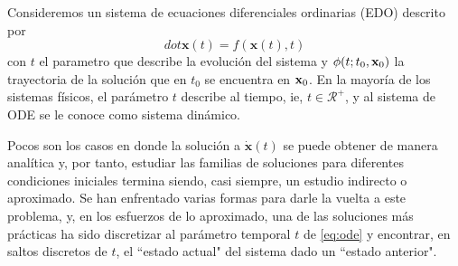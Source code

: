 Consideremos un sistema de ecuaciones diferenciales ordinarias (EDO) descrito por 
\begin{equation}
dot{\mathbf{x}}(t) = f(\mathbf{x}(t),t)
\label{eq:ode}
\end{equation}
con $t$ el parametro que describe la evolución del sistema y $\phi(t;t_0,\mathbf{x}_0)$ la trayectoria de la solución que en $t_0$ se encuentra en $\mathbf{x}_0$. En la mayoría de los sistemas físicos, el parámetro $t$ describe al tiempo, ie, $t \in \mathcal{R}^+$, y al sistema de ODE se le conoce como sistema dinámico.

Pocos son los casos en donde la solución a $\dot{\mathbf{x}}(t)$ se puede obtener de manera analítica y, por tanto, estudiar las familias de soluciones para diferentes condiciones iniciales termina siendo, casi siempre, un estudio indirecto o aproximado. Se han enfrentado varias formas para darle la vuelta a este problema, y, en los esfuerzos de lo aproximado, una de las soluciones más prácticas ha sido discretizar al parámetro temporal $t$ de \ref{eq:ode} y encontrar, en saltos discretos de $t$, el ``estado actual" del sistema dado un ``estado anterior".

